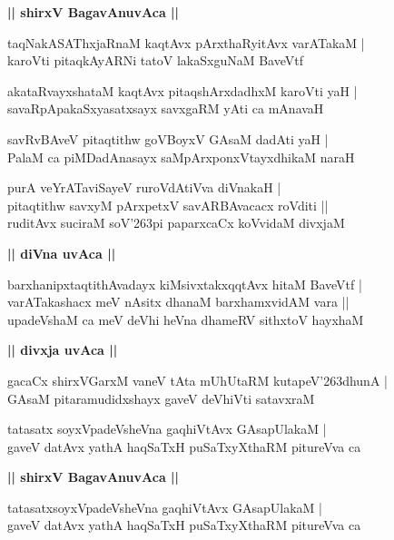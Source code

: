 \documentclass[twoside,12pt,openright]{book}
\def\S{\char'263}
\newcounter{shloka}[chapter]
\def\uvaca#1{\centerline{{\large\textbf{#1}}}}
\begin{document}
\uvaca{|| shirxV BagavAnuvAca ||}

\begin{shloka}%
taqNakASAThxjaRnaM kaqtAvx pArxthaRyitAvx varATakaM |\\
karoVti pitaqkAyARNi tatoV lakaSxguNaM BaveVtf
\end{shloka}

\begin{shloka}%
akataRvayxshataM kaqtAvx pitaqshArxdadhxM karoVti yaH |\\
savaRpApakaSxyasatxsayx savxgaRM yAti ca mAnavaH 
\end{shloka}

\begin{shloka}%
savRvBAveV pitaqtithw goVBoyxV GAsaM dadAti yaH |\\
PalaM ca piMDadAnasayx saMpArxponxVtayxdhikaM naraH 
\end{shloka}

\begin{shloka}%
purA veYrATaviSayeV ruroVdAtiVva diVnakaH |\\
pitaqtithw savxyM pArxpetxV savARBAvacacx roVditi ||\\
ruditAvx suciraM soV\S pi paparxcaCx koVvidaM divxjaM 
\end{shloka}

\uvaca{|| diVna uvAca ||}

\begin{shloka}%
barxhanipxtaqtithAvadayx kiMsivxtakxqqtAvx hitaM BaveVtf |\\
varATakashacx meV nAsitx dhanaM barxhamxvidAM vara ||\\
upadeVshaM ca meV deVhi heVna dhameRV sithxtoV hayxhaM 
\end{shloka}

\uvaca{|| divxja uvAca ||}

\begin{shloka}%
gacaCx shirxVGarxM vaneV tAta mUhUtaRM kutapeV\S dhunA |\\
GAsaM pitaramudidxshayx gaveV deVhiVti satavxraM 
\end{shloka}

\begin{shloka}%
tatasatx soyxVpadeVsheVna gaqhiVtAvx GAsapUlakaM |\\
gaveV datAvx yathA haqSaTxH puSaTxyXthaRM pitureVva ca
\end{shloka}

\uvaca{|| shirxV BagavAnuvAca ||}

\begin{shloka}%
tatasatxsoyxVpadeVsheVna gaqhiVtAvx GAsapUlakaM |\\
gaveV datAvx yathA haqSaTxH puSaTxyXthaRM pitureVva ca 
\end{shloka}
\end{document}
